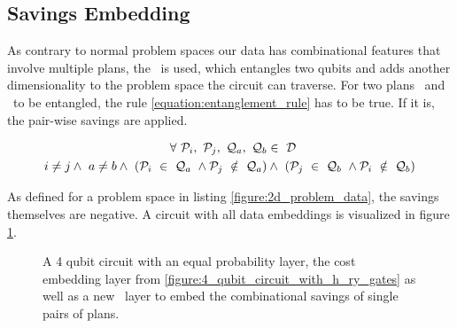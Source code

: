 \clearpage

\subsection{Savings Embedding}

As contrary to normal problem spaces our data has combinational features that involve multiple plans, the \crzgate\ is used, which entangles two qubits and adds another dimensionality to the problem space the circuit can traverse. For two plans \plani\ and \planj\ to be entangled, the rule \ref{equation:entanglement_rule} has to be true. If it is, the pair-wise savings are applied.

\begin{equation}
\centering
    \begin{split}
        \forall\  \mathcal{P}_i,\ \mathcal{P}_j,\ \mathcal{Q}_a,\ \mathcal{Q}_b &\in\ \mathcal{D}\ \\ 
        i \neq j \wedge\ a \neq b \wedge\ \left(\mathcal{P}_i\ \in\ \mathcal{Q}_a\ \wedge \mathcal{P}_j\ \notin\ \mathcal{Q}_a\right) &\wedge\ \left(\mathcal{P}_j\ \in\ \mathcal{Q}_b\ \wedge \mathcal{P}_i\ \notin\ \mathcal{Q}_b\right)\\
    \end{split}
    \label{equation:entanglement_rule}
\end{equation}


As defined for a problem space in listing \ref{figure:2d_problem_data}, the savings themselves are negative. A circuit with all data embeddings is visualized in figure \ref{figure:4_qubit_circuit_with_h_ry_crz_gates}.

\begin{figure}[!h]
    \centering
    \caption{A 4 qubit circuit with an equal probability layer, the cost embedding layer from \ref{figure:4_qubit_circuit_with_h_ry_gates} as well as a new \crzgate\ layer to embed the combinational savings of single pairs of plans.}
    \label{figure:4_qubit_circuit_with_h_ry_crz_gates}
\end{figure}

